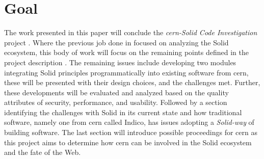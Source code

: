 \section{Goal}

The work presented in this paper will conclude the \textit{\gls{cern}-Solid Code Investigation} project \cite{cern-solid-code-investigation-project-description}. Where the previous job done in \cite{cern-solid-investigation-spec} focused on analyzing the Solid ecosystem, this body of work will focus on the remaining points defined in the project description \cite{cern-solid-code-investigation-project-description}. The remaining issues include developing two modules integrating Solid principles programmatically into existing software from \gls{cern}, these will be presented with their design choices, and the challenges met. Further, these developments will be evaluated and analyzed based on the quality attributes of security, performance, and usability. Followed by a section identifying the challenges with Solid in its current state and how traditional software, namely one from \gls{cern} called Indico, has issues adopting a \textit{Solid-way} of building software. The last section will introduce possible proceedings for \gls{cern} as this project aims to determine how \gls{cern} can be involved in the Solid ecosystem and the fate of the Web.
